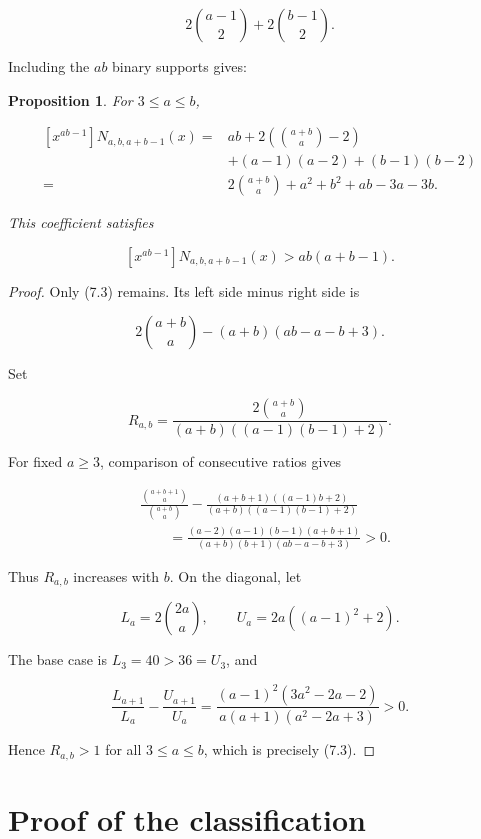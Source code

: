 \documentclass[11pt]{article}
\newtheorem{proposition}[theorem]{Proposition}
\numberwithin{equation}{section}
\begin{document}
\nopagebreak[4]
\[
2\binom{a-1}{2}+2\binom{b-1}{2}.
\]

Including the $ab$ binary supports gives:

\Needspace{0.25\textheight}
\begin{proposition}

For $3\le a\le b$,

\nopagebreak[4]
\[
\begin{aligned}
[x^{ab-1}]N_{a,b,a+b-1}(x)
={}&ab+2\left(\binom{a+b}{a}-2\right)\\
&+(a-1)(a-2)+(b-1)(b-2)\\
={}&2\binom{a+b}{a}+a^2+b^2+ab-3a-3b.
\end{aligned}
\tag{7.2}
\]

This coefficient satisfies

\nopagebreak[4]
\[
[x^{ab-1}]N_{a,b,a+b-1}(x)>ab(a+b-1).
\tag{7.3}
\]

\end{proposition}

\begin{proof}

Only (7.3) remains. Its left side minus right side is

\nopagebreak[4]
\[
2\binom{a+b}{a}-(a+b)(ab-a-b+3).
\tag{7.4}
\]

Set

\nopagebreak[4]
\[
R_{a,b}=
\frac{2\binom{a+b}{a}}
{(a+b)((a-1)(b-1)+2)}.
\]

For fixed $a\ge3$, comparison of consecutive ratios gives

\nopagebreak[4]
\[
\begin{aligned}
&\frac{\binom{a+b+1}{a}}{\binom{a+b}{a}}
-\frac{(a+b+1)((a-1)b+2)}
{(a+b)((a-1)(b-1)+2)}\\
&\qquad=
\frac{(a-2)(a-1)(b-1)(a+b+1)}
{(a+b)(b+1)(ab-a-b+3)}>0.
\end{aligned}
\]

Thus $R_{a,b}$ increases with $b$. On the diagonal, let

\nopagebreak[4]
\[
L_a=2\binom{2a}{a},
\qquad
U_a=2a((a-1)^2+2).
\]

The base case is $L_3=40>36=U_3$, and

\nopagebreak[4]
\[
\frac{L_{a+1}}{L_a}-\frac{U_{a+1}}{U_a}
=
\frac{(a-1)^2(3a^2-2a-2)}
{a(a+1)(a^2-2a+3)}>0.
\]

Hence $R_{a,b}>1$ for all $3\le a\le b$, which is precisely (7.3).
\end{proof}


\section{Proof of the classification}
\end{document}
